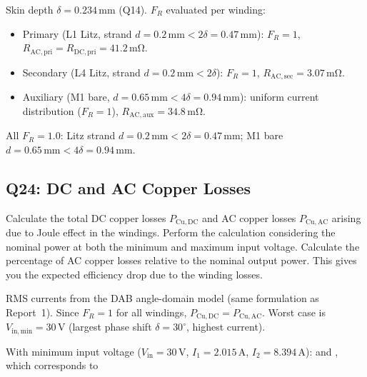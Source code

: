 \documentclass{PELsmallreport}
\begin{document}
\begin{framed}
Skin depth $\delta=0.234\,\mathrm{mm}$ (Q14). $F_R$ evaluated per winding:
\begin{itemize}
    \item Primary (L1 Litz, strand $d=0.2\,\mathrm{mm}<2\delta=0.47\,\mathrm{mm}$): $F_R=1$, $R_\mathrm{AC,pri}=R_\mathrm{DC,pri}=41.2\,\mathrm{m\Omega}$.
    \item Secondary (L4 Litz, strand $d=0.2\,\mathrm{mm}<2\delta$): $F_R=1$, $R_\mathrm{AC,sec}=3.07\,\mathrm{m\Omega}$.
    \item Auxiliary (M1 bare, $d=0.65\,\mathrm{mm}<4\delta=0.94\,\mathrm{mm}$): uniform current distribution ($F_R=1$), $R_\mathrm{AC,aux}=34.8\,\mathrm{m\Omega}$.
\end{itemize}
\end{framed}

 \quad {} \quad {} \hfill{}

\noindent All $F_R = 1.0$: Litz strand $d=0.2\,\mathrm{mm} < 2\delta=0.47\,\mathrm{mm}$; M1 bare $d=0.65\,\mathrm{mm} < 4\delta=0.94\,\mathrm{mm}$.






\subsection{Q24: DC and AC Copper Losses} 
Calculate the total DC copper losses $P_\mathrm{Cu,DC}$ and AC copper losses $P_\mathrm{Cu,AC}$ arising due to Joule effect in the windings. 
Perform the calculation considering the nominal power at both the minimum and maximum input voltage. 
Calculate the percentage of AC copper losses relative to the nominal output power. 
This gives you the expected efficiency drop due to the winding losses. 

\begin{framed}
RMS currents from the DAB angle-domain model (same formulation as Report~1).
Since $F_R=1$ for all windings, $P_\mathrm{Cu,DC}=P_\mathrm{Cu,AC}$.
Worst case is $V_\mathrm{in,min}=30\,\mathrm{V}$ (largest phase shift $\delta=30^\circ$, highest current).
\end{framed}

With minimum input voltage ($V_\mathrm{in}=30\,\mathrm{V}$, $I_1=2.015\,\mathrm{A}$, $I_2=8.394\,\mathrm{A}$):
 and , which corresponds to \\
\end{document}
